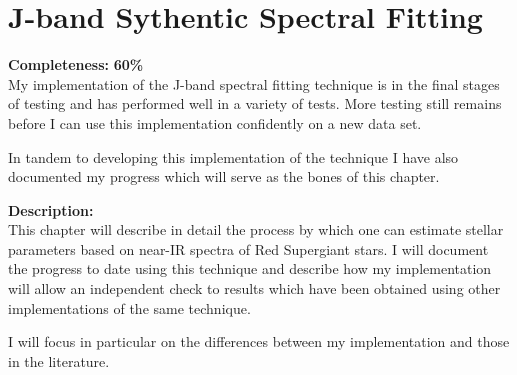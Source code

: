 \chapter{J-band Sythentic Spectral Fitting}

\textbf{Completeness:} \textbf{60\%} \\
My implementation of the J-band spectral fitting technique is in the final
stages of testing and has performed well in a variety of tests.
More testing still remains before I can use this implementation confidently
on a new data set.

In tandem to developing this implementation of the technique I have also
documented my progress which will serve as the bones of this chapter.

\textbf{Description:} \\
This chapter will describe in detail the process by which one can estimate
stellar parameters based on near-IR spectra of Red Supergiant stars.
I will document the progress to date using this technique and describe how
my implementation will allow an independent check to results which have
been obtained using other implementations of the same technique.

I will focus in particular on the differences between my implementation and
those in the literature.
